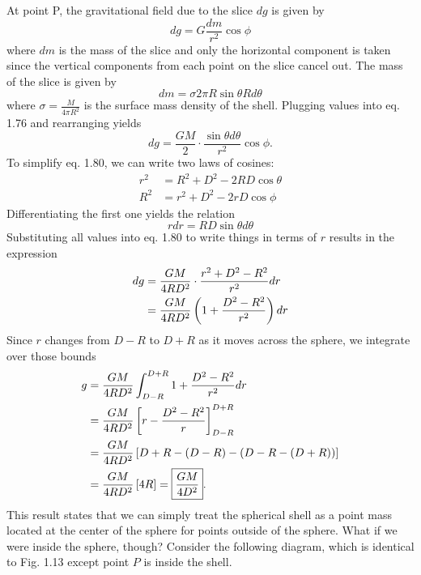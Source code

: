 \noindent At point P, the gravitational field due to the slice $dg$ is given by 
\begin{equation}
    dg = G\frac{dm}{r^2} \cos\phi
\end{equation}
\noindent where $dm$ is the mass of the slice and only the horizontal component is taken since the vertical components from each point on the slice cancel out. The mass of the slice is given by 
\begin{equation*}
    dm = \sigma 2\pi R\sin\theta Rd\theta
\end{equation*}
\noindent where $\sigma = \frac{M}{4\pi R^2}$ is the surface mass density of the shell. Plugging values into eq. 1.76 and rearranging yields
\begin{equation}
    dg = \frac{GM}{2}\cdot\frac{\sin\theta d\theta}{r^2}\cos\phi.
\end{equation}
\noindent To simplify eq. 1.80, we can write two laws of cosines:
\begin{align*}
    r^2 &= R^2 + D^2 - 2RD\cos\theta \\
    R^2 &= r^2 + D^2 - 2rD\cos\phi
\end{align*}
\noindent Differentiating the first one yields the relation
\begin{equation*}
    rdr = RD\sin\theta d\theta
\end{equation*}
\noindent Substituting all values into eq. 1.80 to write things in terms of $r$ results in the expression
\begin{align}
    dg &= \frac{GM}{4RD^2}\cdot\frac{r^2 + D^2 - R^2}{r^2} dr \nonumber \\
    &= \frac{GM}{4RD^2}\left(1 + \frac{D^2 - R^2}{r^2}\right)dr
\end{align}
\noindent Since $r$ changes from $D-R$ to $D+R$ as it moves across the sphere, we integrate over those bounds
\begin{align}
    g &= \frac{GM}{4RD^2}\int_{D-R}^{D+R} 1 + \frac{D^2 - R^2}{r^2}dr \nonumber \\
    &= \frac{GM}{4RD^2}\left[r - \frac{D^2 - R^2}{r}\right]_{D-R}^{D+R} \nonumber \\
    &= \frac{GM}{4RD^2}\left[D + R - (D - R) - (D - R - (D + R))\right] \nonumber \\
    &= \frac{GM}{4RD^2}\left[4R\right] = \boxed{\frac{GM}{4D^2}}.
\end{align}
\noindent This result states that we can simply treat the spherical shell as a point mass located at the center of the sphere for points outside of the sphere. What if we were inside the sphere, though? Consider the following diagram, which is identical to Fig. 1.13 except point $P$ is inside the shell.
